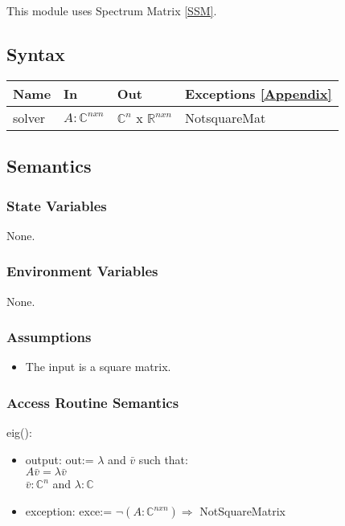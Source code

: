 \documentclass[12pt, titlepage]{article}
\begin{document}
This module uses Spectrum Matrix \ref{SSM}. 

\subsection{Syntax}

\begin{center}
	\begin{tabular}{p{2cm} p{4cm} p{4cm} p{4cm}}
		\hline
		\textbf{Name} & \textbf{In} & \textbf{Out} & \textbf{Exceptions} 
		\ref{Appendix} \\
		\hline
		solver & $A : \mathbb{C}^{nxn}$  & 
		$\mathbb{C}^{n}$ x $\mathbb{R}^{nxn}$ & NotsquareMat \\
		\hline
	\end{tabular}
\end{center}

\subsection{Semantics}

\subsubsection{State Variables}

None.

\subsubsection{Environment Variables}

None.

\subsubsection{Assumptions}

\begin{itemize}
	\item The input is a square matrix. 
\end{itemize}

\subsubsection{Access Routine Semantics}

\noindent eig():
\begin{itemize}
	\item output: out:= $\lambda$ and $\bar{v}$ such that:\\
	$A\bar{v} = \lambda \bar{v}$ \\
	$\bar{v} : \mathbb{C}^{n}$ and $\lambda : \mathbb{C}$
	\item exception: exce:= $ \neg (A : \mathbb{C}^{nxn}) \Rightarrow$ 
	NotSquareMatrix 
\end{itemize}
\end{document}
